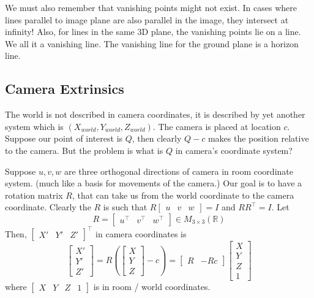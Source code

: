 \documentclass[11pt]{article}
\newcommand{\R}{\mathbb{R}}
\newcommand{\mat}[2]{M_{#1 \times #2}(\R)}
\begin{document}
We must also remember that vanishing points might not exist. In cases where lines parallel to image plane are also parallel in the image, they intersect at infinity! Also, for lines in the same 3D plane, the vanishing points lie on a line. We all it a vanishing line. The vanishing line for the ground plane is a horizon line. 

\subsection{Camera Extrinsics}
The world is not described in camera coordinates, it is described by yet another system which is $(X_{world}, Y_{world}, Z_{world})$. The camera is placed at location $c$. Suppose our point of interest is $Q$, then clearly $Q - c$ makes the position relative to the camera. But the problem is what is $Q$ in camera's coordinate system? 

Suppose $u, v, w$ are three orthogonal directions of camera in room coordinate system. (much like a basis for movements of the camera.) Our goal is to have a rotation matrix $R$, that can take us from the world coordinate to the camera coordinate. Clearly the $R$ is such that $R \begin{bmatrix}
	u & v & w
\end{bmatrix} = I$ and $R R^\top = I$. 
Let 
\begin{equation}
	R = \begin{bmatrix}
		u^\top & v^\top & w^\top
	\end{bmatrix} \in\mat{3}{3}
\end{equation}
Then, $\begin{bmatrix}
	X' & Y' & Z'
\end{bmatrix}^\top$ in camera coordinates is
\begin{equation}
	\begin{bmatrix}
		X' \\ Y' \\ Z'
	\end{bmatrix} = R \left( \begin{bmatrix}
		X \\ Y \\ Z
	\end{bmatrix} - c \right) = \begin{bmatrix}
		R & -Rc
	\end{bmatrix}\begin{bmatrix}
		X \\ Y \\ Z \\ 1
	\end{bmatrix}
\end{equation}
where $\begin{bmatrix}
		X & Y & Z & 1
	\end{bmatrix}$ is in room / world coordinates. 
\end{document}
